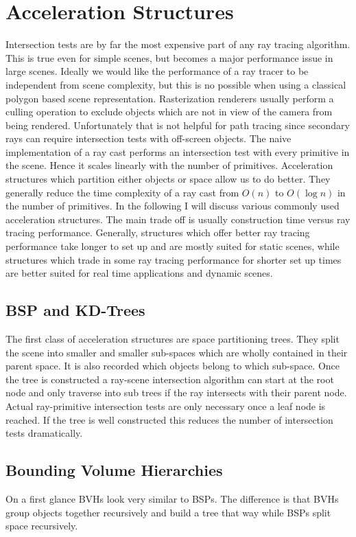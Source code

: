\documentclass{ACGSeminar}
\begin{document}
\section{Acceleration Structures} \label{acceleration}
Intersection tests are by far the most expensive part of any ray tracing algorithm. \cite[7]{Whitted:1980} This is true even for simple scenes, but becomes a major performance issue in large scenes. Ideally we would like the performance of a ray tracer to be independent from scene complexity, but this is no possible when using a classical polygon based scene representation.
Rasterization renderers usually perform a culling operation to exclude objects which are not in view of the camera from being rendered. Unfortunately that is not helpful for path tracing since secondary rays can require intersection tests with off-screen objects.
The naive implementation of a ray cast performs an intersection test with every primitive in the scene. Hence it scales linearly with the number of primitives. Acceleration structures which partition either objects or space allow us to do better. They generally reduce the time complexity of a ray cast from $O(n)$ to $O(\log n)$ in the number of primitives. In the following I will discuss various commonly used acceleration structures. The main trade off is usually construction time versus ray tracing performance. Generally, structures which offer better ray tracing performance take longer to set up and are mostly suited for static scenes, while structures which trade in some ray tracing performance for shorter set up times are better suited for real time applications and dynamic scenes. \cite{Karras:2012:MPC:2383795.2383801}

\subsection{BSP and KD-Trees}
The first class of acceleration structures are space partitioning trees. They split the scene into smaller and smaller sub-spaces which are wholly contained in their parent space. It is also recorded which objects belong to which sub-space. Once the tree is constructed a ray-scene intersection algorithm can start at the root node and only traverse into sub trees if the ray intersects with their parent node. Actual ray-primitive intersection tests are only necessary once a leaf node is reached. If the tree is well constructed this reduces the number of intersection tests dramatically.

\subsection{Bounding Volume Hierarchies}
On a first glance BVHs look very similar to BSPs. The difference is that BVHs group objects together recursively and build a tree that way while BSPs split space recursively. 
\end{document}
